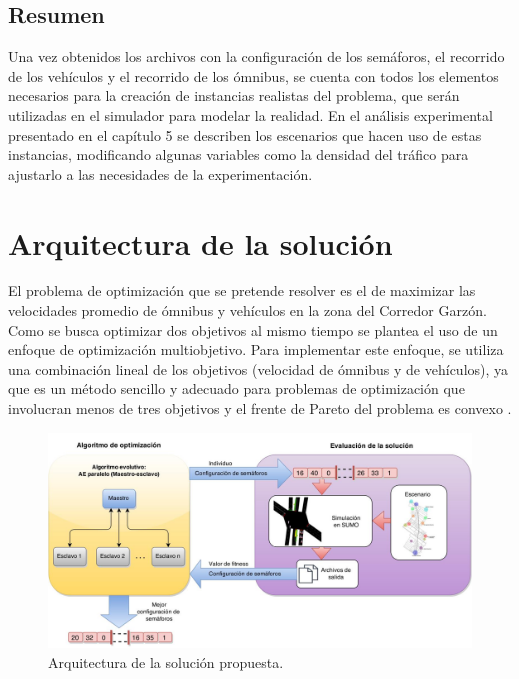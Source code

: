 \subsection{Resumen}

Una vez obtenidos los archivos con la configuración de los semáforos, el recorrido de los vehículos y el recorrido de los ómnibus, se cuenta con todos los elementos necesarios para la creación de instancias realistas del problema, que serán utilizadas en el simulador para modelar la realidad.  En el análisis experimental presentado en el capítulo 5 se describen los escenarios que hacen uso de estas instancias, modificando algunas variables como la densidad del tráfico para ajustarlo a las necesidades de la experimentación.



\section{Arquitectura de la solución}


El problema de optimización que se pretende resolver es el de maximizar las velocidades promedio de ómnibus y vehículos en la zona del Corredor Garzón. Como se busca optimizar dos objetivos al mismo tiempo se plantea el uso de un enfoque de optimización multiobjetivo. Para implementar este enfoque, se utiliza una combinación lineal de los objetivos (velocidad de ómnibus y de vehículos), ya que es un método sencillo y adecuado para problemas de optimización que involucran menos de tres objetivos y el frente de Pareto del problema es convexo \citep{coello2002evolutionary}.



\begin{figure}[ht]
	\centering
	\includegraphics[width=0.99\linewidth]{Figures/arquitectura1}
	\caption{Arquitectura de la solución propuesta.}
	\label{fig:arquitectura1}
\end{figure}

